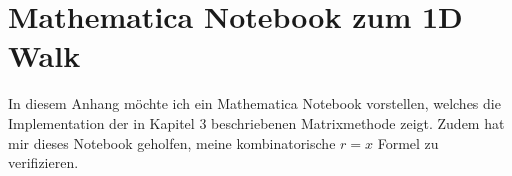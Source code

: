 \documentclass[a4paper, 12pt]{report}
\begin{document}
\appendix
\chapter{Mathematica Notebook zum 1D Walk}
In diesem Anhang möchte ich ein Mathematica Notebook vorstellen, welches die Implementation der in Kapitel 3 beschriebenen Matrixmethode zeigt. Zudem hat mir dieses Notebook geholfen, meine kombinatorische $r=x$ Formel zu verifizieren.
	





\end{document}
